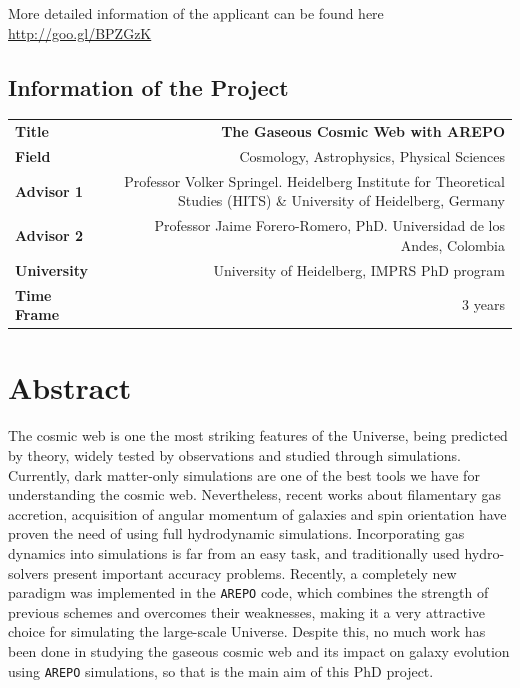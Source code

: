 \documentclass[a4,useAMS,usenatbib,usegraphicx,12pt]{article}
\begin{document}
\vspace{10pt}

More detailed information of the applicant can be found here \url{http://goo.gl/BPZGzK}

\vspace{15pt}  

\subsection*{Information of the Project}
\begin{tabular}{L!{\VRule}R}
\bf Title		& \bf The Gaseous Cosmic Web with AREPO\\
\bf Field		& Cosmology, Astrophysics, Physical Sciences \\
\bf Advisor 1	& Professor Volker Springel. Heidelberg Institute for Theoretical Studies (HITS) 
\& University of Heidelberg, Germany \\
\bf Advisor 2	& Professor Jaime Forero-Romero, PhD. Universidad de los Andes, Colombia \\
\bf University	& University of Heidelberg, IMPRS PhD program \\
\bf Time Frame	& 3 years \\
\end{tabular}
\normalsize


\section{Abstract}


The cosmic web is one the most striking features of the Universe, being 
predicted by theory, widely tested by observations and studied through 
simulations. Currently, dark matter-only simulations are one of the best tools 
we have for understanding the cosmic web. Nevertheless, recent works about 
filamentary gas accretion, acquisition of angular momentum of galaxies and spin 
orientation have proven the need of using full hydrodynamic simulations. 
Incorporating gas dynamics into simulations is far from an easy task, and 
traditionally used hydro-solvers present important accuracy problems. Recently, 
a completely new paradigm was implemented in the \texttt{AREPO} code, which 
combines the strength of previous schemes and overcomes their weaknesses, making
it a very attractive choice for simulating the large-scale Universe. Despite 
this, no much work has been done in studying the gaseous cosmic web and its 
impact on galaxy evolution using \texttt{AREPO} simulations, so that is the 
main aim of this PhD project.
\end{document}
